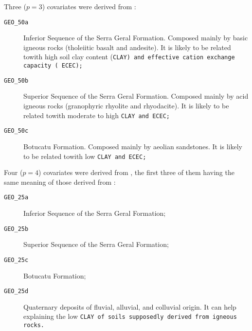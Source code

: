 
Three ($p = 3$) covariates were derived from \geoOld{}:

\begin{description}
 \item[\tt{GEO\_50a}] Inferior Sequence of the Serra Geral Formation. Composed mainly by basic 
 igneous rocks (tholeiitic basalt and andesite). It is likely to be related towith high soil clay content 
(\tt{CLAY}) and effective cation exchange capacity (
 \tt{ECEC});
 
 \item[\tt{GEO\_50b}] Superior Sequence of the Serra Geral Formation. Composed mainly by acid 
 igneous rocks (granophyric rhyolite and rhyodacite). It is likely to be related towith moderate to 
 high \tt{CLAY} and \tt{ECEC};
 
 \item[\tt{GEO\_50c}] Botucatu Formation. Composed mainly by aeolian sandstones. It is likely 
 to be related towith low \tt{CLAY} and \tt{ECEC};
\end{description}

Four ($p = 4$) covariates were derived from \geoNew{}, the first three of them having the same meaning 
of those derived from \geoOld{}:

\begin{description}
 \item[\tt{GEO\_25a}] Inferior Sequence of the Serra Geral Formation;
 
 \item[\tt{GEO\_25b}] Superior Sequence of the Serra Geral Formation;
 
 \item[\tt{GEO\_25c}] Botucatu Formation;
 
 \item[\tt{GEO\_25d}] Quaternary deposits of fluvial, alluvial, and colluvial 
 origin. It can help explaining the low \tt{CLAY} of soils supposedly derived from igneous rocks.
\end{description}

